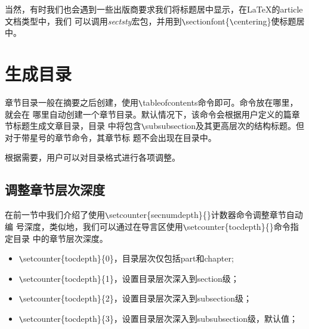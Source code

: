 当然，有时我们也会遇到一些出版商要求我们将标题居中显示，在LaTeX的article文档类型中，我们
可以调用\emph{sectsty}宏包，并用到\verb|\|sectionfont\{\verb|\|centering\}使标题居中。

\section{生成目录}
章节目录一般在摘要之后创建，使用\verb|\|tableofcontents命令即可。命令放在哪里，就会在
哪里自动创建一个章节目录。默认情况下，该命令会根据用户定义的篇章节标题生成文章目录，目录
中将包含\verb|\|subsubsection及其更高层次的结构标题。但对于带星号的章节命令，其章节标
题不会出现在目录中。

根据需要，用户可以对目录格式进行各项调整。

\subsection{调整章节层次深度}
在前一节中我们介绍了使用\verb|\|setcounter\{secnumdepth\}\{\}计数器命令调整章节自动编
号深度，类似地，我们可以通过在导言区使用\verb|\|setcounter\{tocdepth\}\{\}命令指定目录
中的章节层次深度。
\begin{itemize}
      \item \verb|\|setcounter\{tocdepth\}\{0\}，目录层次仅包括part和chapter;
      \item \verb|\|setcounter\{tocdepth\}\{1\}，设置目录层次深入到section级；
      \item \verb|\|setcounter\{tocdepth\}\{2\}，设置目录层次深入到subsection级；
      \item \verb|\|setcounter\{tocdepth\}\{3\}，设置目录层次深入到subsubsection级，默认值；
\end{itemize}

